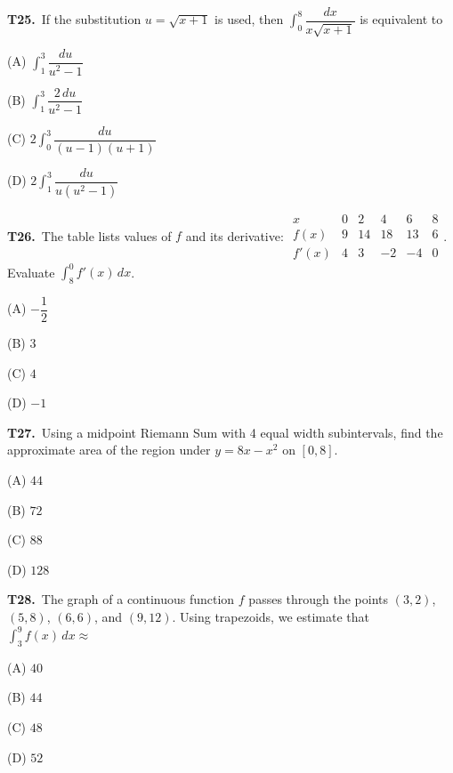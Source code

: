 \documentclass[11pt]{article}
\begin{document}
\bigskip\noindent\textbf{T25.}\ If the substitution $u=\sqrt{x+1}$ is used, then $\displaystyle\int_{0}^{8} \dfrac{dx}{x\sqrt{x+1}}$ is equivalent to
\begin{list}{}{\setlength{\leftmargin}{3em}\setlength{\labelwidth}{2.5em}\setlength{\itemsep}{0pt}\setlength{\topsep}{2pt}}
\item[(A)] $\displaystyle\int_{1}^{3} \dfrac{du}{u^2-1}$
\item[(B)] $\displaystyle\int_{1}^{3} \dfrac{2\,du}{u^2-1}$
\item[(C)] $\displaystyle 2\int_{0}^{3} \dfrac{du}{(u-1)(u+1)}$
\item[(D)] $\displaystyle 2\int_{1}^{3} \dfrac{du}{u(u^2-1)}$
\end{list}

\bigskip\noindent\textbf{T26.}\ The table lists values of $f$ and its derivative: $\begin{array}{c|rrrrr}x&0&2&4&6&8\\\hline f(x)&9&14&18&13&6\\f'(x)&4&3&-2&-4&0\end{array}$. Evaluate $\int_8^0f'(x)\,dx$.
\begin{list}{}{\setlength{\leftmargin}{3em}\setlength{\labelwidth}{2.5em}\setlength{\itemsep}{0pt}\setlength{\topsep}{2pt}}
\item[(A)] $-\dfrac{1}{2}$
\item[(B)] $3$
\item[(C)] $4$
\item[(D)] $-1$
\end{list}

\bigskip\noindent\textbf{T27.}\ Using a midpoint Riemann Sum with 4 equal width subintervals, find the approximate area of the region under $y=8x-x^2$ on $[0,8]$.
\begin{list}{}{\setlength{\leftmargin}{3em}\setlength{\labelwidth}{2.5em}\setlength{\itemsep}{0pt}\setlength{\topsep}{2pt}}
\item[(A)] $44$
\item[(B)] $72$
\item[(C)] $88$
\item[(D)] $128$
\end{list}

\bigskip\noindent\textbf{T28.}\ The graph of a continuous function $f$ passes through the points $(3,2)$, $(5,8)$, $(6,6)$, and $(9,12)$. Using trapezoids, we estimate that $\displaystyle\int_{3}^{9} f(x)\,dx \approx$
\begin{list}{}{\setlength{\leftmargin}{3em}\setlength{\labelwidth}{2.5em}\setlength{\itemsep}{0pt}\setlength{\topsep}{2pt}}
\item[(A)] $40$
\item[(B)] $44$
\item[(C)] $48$
\item[(D)] $52$
\end{list}
\end{document}
